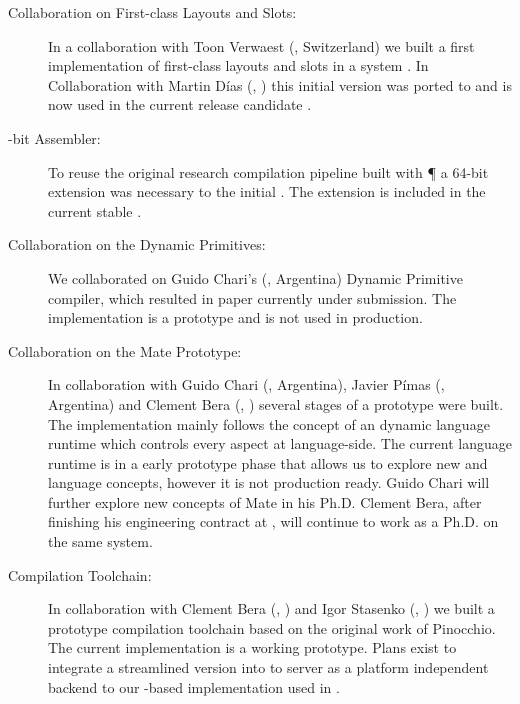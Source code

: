 \begin{description}
	\item[Collaboration on First-class Layouts and Slots:]
		In a collaboration with To\-on Verwaest (\SCG, Switzerland) we built a first implementation of first-class layouts and slots in a \ST system \cite{Verw11a}.
		In Collaboration with Martin Días (\RMoD, \INRIA) this initial version was ported to \PH and is now used in the current release candidate .

	\item[-bit Assembler:]
		To reuse the original research compilation pipeline built with \P \cite{Verw10a, Brun11a} a 64-bit extension was necessary to the initial .
		The extension is included in the current stable .

	\item[Collaboration on the \WF Dynamic Primitives:]
		We collaborated on Guido Chari's (\UBA, Argentina) \WF Dynamic Primitive compiler, which resulted in paper currently under submission\cite{Char13a}.
		The implementation is a prototype and is not used in production.

	\item[Collaboration on the Mate \VM Prototype:]
		In collaboration with Guido Chari (\UBA, Argentina), Javier Pímas (\UBA, Argentina) and Clement Bera (\RMoD, \INRIA) several stages of a prototype \VM were built.
		The implementation mainly follows the concept of an dynamic language runtime which controls every aspect at language-side.
		The current language runtime is in a early prototype phase that allows us to explore new \VM and language concepts, however it is not production ready.
		Guido Chari will further explore new concepts of Mate in his Ph.D.
		Clement Bera, after finishing his engineering contract at \RMoD, will continue to work as a Ph.D. on the same system.

	\item[\VirtualCPU Compilation Toolchain:]
		In collaboration with Clement Bera (\RMoD, \INRIA) and Igor Stasenko (\RMoD, \INRIA) we built a prototype compilation toolchain based on the original work of Pinocchio.
		The current implementation is a working prototype.
		Plans exist to integrate a streamlined version into \PH to server as a platform independent backend to our \B-based \FFI implementation used in \PH.


\end{description}
